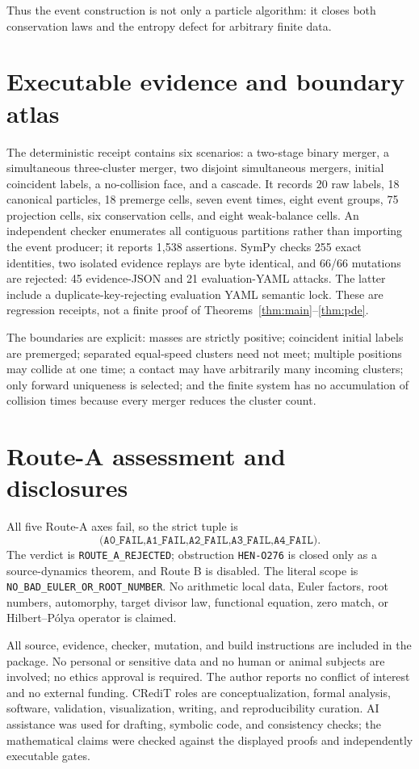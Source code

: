 \documentclass[10pt]{article}
\begin{document}
Thus the event construction is not only a particle algorithm: it closes both
conservation laws and the entropy defect for arbitrary finite data.

\section{Executable evidence and boundary atlas}
The deterministic receipt contains six scenarios: a two-stage binary
merger, a simultaneous three-cluster merger, two disjoint simultaneous
mergers, initial coincident labels, a no-collision face, and a cascade.  It
records 20 raw labels, 18 canonical particles, 18 premerge cells, seven
event times, eight event groups, 75 projection cells, six conservation
cells, and eight weak-balance cells.  An independent checker enumerates all
contiguous partitions rather than importing the event producer; it reports
1,538 assertions.  SymPy checks 255 exact identities, two isolated evidence
replays are byte identical, and 66/66 mutations are rejected: 45 evidence-JSON
and 21 evaluation-YAML attacks.  The latter include a duplicate-key-rejecting
evaluation YAML semantic lock.  These are regression receipts, not a finite
proof of Theorems~\ref{thm:main}--\ref{thm:pde}.

The boundaries are explicit: masses are strictly positive; coincident
initial labels are premerged; separated equal-speed clusters need not meet;
multiple positions may collide at one time; a contact may have arbitrarily
many incoming clusters; only forward uniqueness is selected; and the finite
system has no accumulation of collision times because every merger reduces
the cluster count.

\section{Route-A assessment and disclosures}
All five Route-A axes fail, so the strict tuple is
\[
 \texttt{(A0\_FAIL,A1\_FAIL,A2\_FAIL,A3\_FAIL,A4\_FAIL)}.
\]
The verdict is \texttt{ROUTE\_A\_REJECTED}; obstruction \texttt{HEN-O276}
is closed only as a source-dynamics theorem, and Route B is disabled.  The
literal scope is \texttt{NO\_BAD\_EULER\_OR\_ROOT\_NUMBER}.  No arithmetic
local data, Euler factors, root numbers, automorphy, target divisor law,
functional equation, zero match, or Hilbert--P\'olya operator is claimed.

All source, evidence, checker, mutation, and build instructions are included
in the package.  No personal or sensitive data and no human or animal
subjects are involved; no ethics approval is required.  The author reports
no conflict of interest and no external funding.  CRediT roles are
conceptualization, formal analysis, software, validation, visualization,
writing, and reproducibility curation.  AI assistance was used for drafting,
symbolic code, and consistency checks; the mathematical claims were checked
against the displayed proofs and independently executable gates.
\fi
\end{document}
